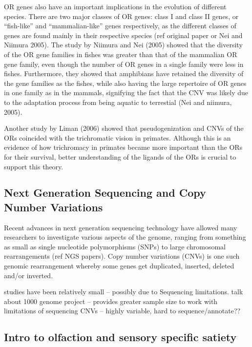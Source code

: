 \documentclass[a4paper, 12pt]{article}
\begin{document}
OR genes also have an important implications in the evolution of different species.
There are two major classes of OR genes: class I and class II genes, or ``fish-like'' and ``mammalian-like'' genes respectively, as the different classes of genes are found mainly in their respective species (ref original paper or Nei and Niimura 2005).
The study by Niimura and Nei (2005) showed that the diversity of the OR gene families in fishes was greater than that of the mammalian OR gene family, even though the number of OR genes in a single family were less in fishes.
Furthermore, they showed that amphibians have retained the diversity of the gene families as the fishes, while also having the large repertoire of OR genes in one family as in the mammals, signifying the fact that the CNV was likely due to the adaptation process from being aquatic to terrestial (Nei and niimura, 2005).

Another study by Liman (2006) showed that pseudogenization and CNVs of the ORs coincided with the trichromatic vision in primates.
Although this is an evidence of how trichromacy in primates became more important than the ORs for their survival, better understanding of the ligands of the ORs is crucial to support this theory.


\subsection*{Next Generation Sequencing and Copy Number Variations}

Recent advances in next generation sequencing technology have allowed many researchers to investigate various aspects of the genome, ranging from something as small as single nucleotide polymorphisms (SNPs) to large chromosomal rearrangements (ref NGS papers).
Copy number variations (CNVs) is one such genomic rearrangement whereby some genes get duplicated, inserted, deleted and/or inverted.

studies have been relatively small -- possibly due to Sequencing limitations.
talk about 1000 genome project -- provides greater sample size to work with
limitations of sequencing CNVs -- highly variable, hard to sequence/annotate??

\subsection*{Intro to olfaction and sensory specific satiety}
\end{document}
